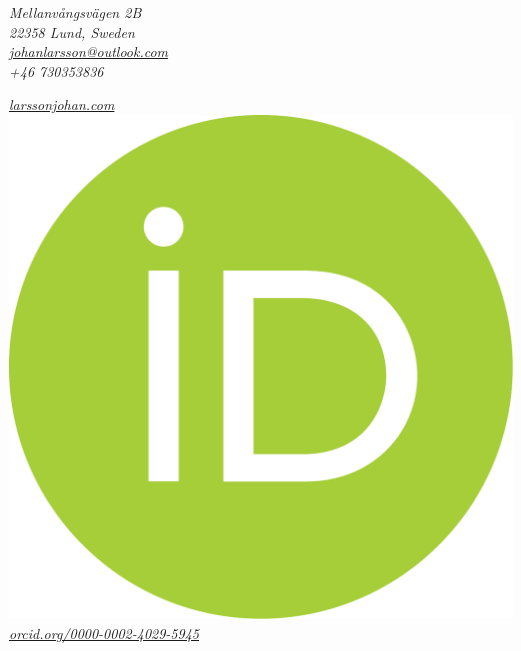 \documentclass[
  DIV=calc,
  parskip=half,
  headsepline=true
]{scrartcl}
\newlength{\capheight}
\begin{document}
\begin{minipage}{.5\textwidth}
\small
\itshape
\noindent Mellanvångsvägen 2B\\
22358 Lund, Sweden\\
\href{mailto:johanlarsson@outlook.com}{johanlarsson@outlook.com}\\
+46 730353836

\end{minipage}%
\begin{minipage}{0.5\textwidth}
\raggedleft\itshape\small
\href{https://larssonjohan.com}{larssonjohan.com}\\
\href{http://orcid.org/0000-0002-4029-5945}{\includegraphics[height=\capheight]{assets/orcid.pdf} orcid.org/0000-0002-4029-5945}\\

\end{minipage}
\end{document}
